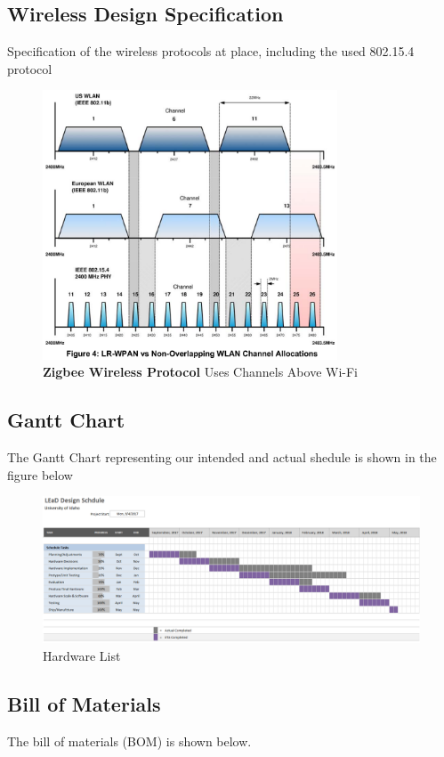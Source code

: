 \documentclass[12pt]{article}
\begin{document}
{{{{		\subsection{Wireless Design Specification}
			Specification of the wireless protocols at place, including the used 802.15.4 protocol
			\begin{figure}[!htb]
				\centering
				\includegraphics[height = 80mm]{assets/Zigbee.png}
				\caption{ \textbf{Zigbee Wireless Protocol} Uses Channels Above Wi-Fi \label{overflow}}
			\end{figure}
	
		\subsection{Gantt Chart}
			The Gantt Chart representing our intended and actual shedule is shown in the figure below
			\begin{figure}[ht!]
				\centering
				\includegraphics[width=170mm]{assets/Gantt_Chart_Shedule.png}
				\caption{Hardware List \label{overflow}}
			\end{figure}
		
		\subsection{Bill of Materials}
		The bill of materials (BOM) is shown below.
		
}}}}
\end{document}

